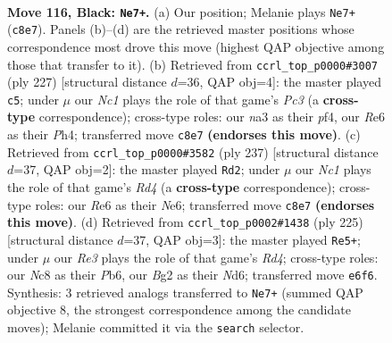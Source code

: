\documentclass[11pt]{article}
\begin{document}
\clearpage

\begin{figure}[p]\centering
\begin{subfigure}{0.46\textwidth}\centering
\resizebox{\linewidth}{!}{%
\newchessgame
\chessboard[
  setfen={2n3K1/1k6/p3r3/P4p1p/5B2/N5P1/6b1/R7 b - - 43 116},
  showmover=false,
  pgfstyle=straightmove, color=movearrow, markmove={c8-e7}
]}
\caption{}
\end{subfigure}\hfill
\begin{subfigure}{0.46\textwidth}\centering
\resizebox{\linewidth}{!}{%
\newchessgame
\chessboard[
  setfen={8/8/2p5/5p1k/p4P1p/P1B4P/1P6/3b2K1 b - - 16 114},
  showmover=false,
  pgfstyle=straightmove, color=movearrow, markmove={c6-c5}
]}
\caption{}
\end{subfigure}
\\[4pt]
\begin{subfigure}{0.46\textwidth}\centering
\resizebox{\linewidth}{!}{%
\newchessgame
\chessboard[
  setfen={4k3/R7/4n1p1/3r1p2/7P/5PP1/8/B4K2 b - - 24 119},
  showmover=false,
  pgfstyle=straightmove, color=movearrow, markmove={d5-d2}
]}
\caption{}
\end{subfigure}\hfill
\begin{subfigure}{0.46\textwidth}\centering
\resizebox{\linewidth}{!}{%
\newchessgame
\chessboard[
  setfen={4k3/R7/1p1n4/p2r4/P5BP/5P2/8/4K3 b - - 7 113},
  showmover=false,
  pgfstyle=straightmove, color=movearrow, markmove={d5-e5}
]}
\caption{}
\end{subfigure}
\caption{\textbf{Move 116, Black: \texttt{Ne7+}.} (a) Our position; Melanie plays \texttt{Ne7+} (\texttt{c8e7}). Panels (b)--(d) are the retrieved master positions whose correspondence most drove this move (highest QAP objective among those that transfer to it). (b) Retrieved from \texttt{ccrl\_top\_p0000\#3007} (ply 227) [structural distance $d$=36, QAP obj=4]: the master played \texttt{c5}; under $\mu$ our \emph{Nc1} plays the role of that game's \emph{Pc3} (a \textbf{cross-type} correspondence); cross-type roles: our \emph{n}a3 as their \emph{p}f4, our \emph{R}e6 as their \emph{P}h4; transferred move \texttt{c8e7} \textbf{(endorses this move)}. (c) Retrieved from \texttt{ccrl\_top\_p0000\#3582} (ply 237) [structural distance $d$=37, QAP obj=2]: the master played \texttt{Rd2}; under $\mu$ our \emph{Nc1} plays the role of that game's \emph{Rd4} (a \textbf{cross-type} correspondence); cross-type roles: our \emph{R}e6 as their \emph{N}e6; transferred move \texttt{c8e7} \textbf{(endorses this move)}. (d) Retrieved from \texttt{ccrl\_top\_p0002\#1438} (ply 225) [structural distance $d$=37, QAP obj=3]: the master played \texttt{Re5+}; under $\mu$ our \emph{Re3} plays the role of that game's \emph{Rd4}; cross-type roles: our \emph{N}c8 as their \emph{P}b6, our \emph{B}g2 as their \emph{N}d6; transferred move \texttt{e6f6}. Synthesis: 3 retrieved analogs transferred to \texttt{Ne7+} (summed QAP objective 8, the strongest correspondence among the candidate moves); Melanie committed it via the \texttt{search} selector.}
\label{fig:thought-m231}
\end{figure}
\end{document}
